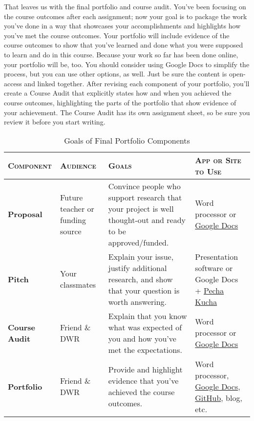 \documentclass[11pt,oneside]{amsart}	%
\begin{document}
That leaves us with the final portfolio and course audit. You've been focusing on the course outcomes after each assignment; now your goal is to package the work you've done in a way that showcases your accomplishments and highlights how you've met the course outcomes. Your portfolio will include evidence of the course outcomes to show that you've learned and done what you were supposed to learn and do in this course. Because your work so far has been done online, your portfolio will be, too. You should consider using Google Docs to simplify the process, but you can use other options, as well. Just be sure the content is open-access and linked together. After revising each component of your portfolio, you'll create a Course Audit that explicitly states how and when you achieved the course outcomes, highlighting the parts of the portfolio that show evidence of your achievement. The Course Audit has its own assignment sheet, so be sure you review it before you start writing.

\begin{table}[b]%
	\caption{Goals of Final Portfolio Components}\label{tab:goals}
\begin{tabulary}{\textwidth}{lLLL}
	\toprule  \textbf{\textsc{Component}} & \mbox{\textbf{\textsc{Audience}}} & \textbf{\textsc{Goals}} & \textbf{\textsc{App or Site to Use}}\\
\midrule	\textbf{Proposal} & Future teacher or funding source & Convince people who support research that your project is well thought-out and ready to be approved/funded. & Word processor or \href{http://docs.google.com}{Google Docs} \\
\midrule	\textbf{Pitch} & Your classmates & Explain your issue, justify additional research, and show that your question is worth answering. & Presentation software or Google Docs + \href{http://www.pechakucha.org/}{Pecha Kucha} \\
\midrule	\textbf{Course Audit} & Friend \& DWR & Explain that you know what was expected of you and how you've met the expectations. & Word processor or \href{http://docs.google.com}{Google Docs} \\
\midrule	\textbf{Portfolio} & Friend \& DWR  & Provide and highlight evidence that you've achieved the course outcomes. & Word processor, \href{http://docs.google.com}{Google Docs}, \href{https://github.com/}{GitHub}, blog, etc. \\
	\bottomrule
\end{tabulary}
\end{table}
\end{document}
